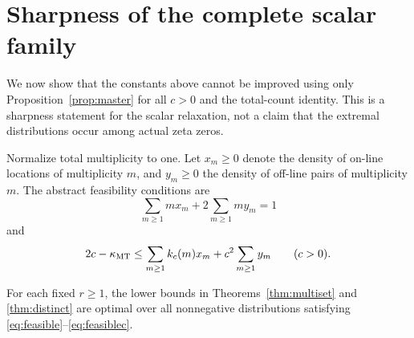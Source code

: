 \section{Sharpness of the complete scalar family}

We now show that the constants above cannot be improved using only Proposition~\ref{prop:master} for all $c>0$ and the total-count identity.  This is a sharpness statement for the scalar relaxation, not a claim that the extremal distributions occur among actual zeta zeros.

Normalize total multiplicity to one.  Let $x_m\geq0$ denote the density of on-line locations of multiplicity $m$, and $y_m\geq0$ the density of off-line pairs of multiplicity $m$.  The abstract feasibility conditions are
\begin{equation}\label{eq:feasible}
\sum_{m\geq1}m x_m+2\sum_{m\geq1}m y_m=1
\end{equation}
and
\begin{equation}\label{eq:feasiblec}
2c-\kappa_{\mathrm{MT}}\leq\sum_{m\geq1}k_c(m)x_m+c^2\sum_{m\geq1}y_m
\qquad(c>0).
\end{equation}

\begin{theorem}[Sharpness]\label{thm:sharp}
For each fixed $r\geq1$, the lower bounds in Theorems~\ref{thm:multiset} and \ref{thm:distinct} are optimal over all nonnegative distributions satisfying \eqref{eq:feasible}--\eqref{eq:feasiblec}.
\end{theorem}

